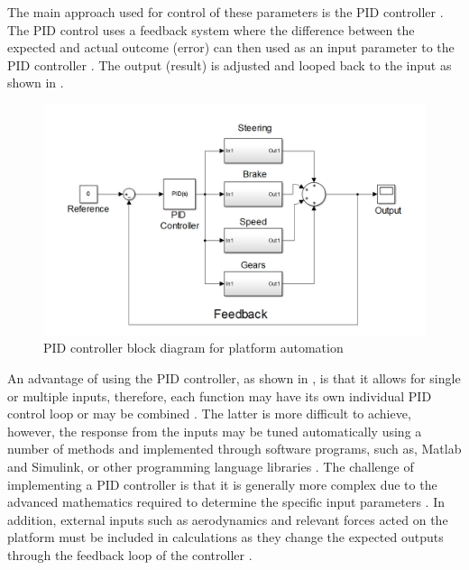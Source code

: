 \documentclass[main.tex]{subfiles}
\begin{document}
The main approach used for control of these parameters is the PID controller \parencite{zhao2012design,tran2007modelling,johnson2005pid}. 
The PID control uses a feedback system where the difference between the expected and actual outcome (error) can then used as an input parameter to the PID controller \parencite{johnson2005pid}. The output (result) is adjusted and looped back to the input as shown in . 

\begin{figure}[ht]
\includegraphics[width=\textwidth]{2-LiteratureReview/PIDblock.PNG}
\centering
\caption[PID controller block diagram for platform automation]{PID controller block diagram for platform automation\parencite{johnson2005pid}} 
\end{figure}

An advantage of using the PID controller, as shown in , is that it allows for single or multiple inputs, therefore, each function may have its own individual PID control loop or may be combined \parencite{johnson2005pid}. The latter is more difficult to achieve, however, the response from the inputs may be tuned automatically using a number of methods and implemented through software programs, such as, Matlab and Simulink, or other programming language libraries \parencite{tran2007modelling,johnson2005pid}. The challenge of implementing a  PID controller is that it is generally more complex due to the advanced mathematics required to determine the specific input parameters \parencite{tran2007modelling}. In addition, external inputs such as aerodynamics and relevant forces acted on the platform must be included in calculations as they change the expected outputs through the feedback loop of the controller \parencite{zhao2012design,johnson2005pid}. 
\end{document}
